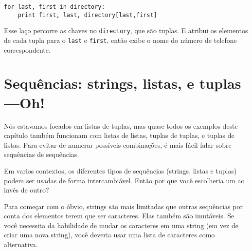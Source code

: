 
\beforeverb
\begin{verbatim}
for last, first in directory:
    print first, last, directory[last,first]
\end{verbatim}
\afterverb
%
Esse laço percorre as chaves no {\tt directory}, que são tuplas. E atribui
os elementos de cada tupla para o {\tt last} e {\tt first}, então exibe o
nome do número de telefone correspondente.

\section{Sequências: strings, listas, e tuplas---Oh!}

Nós estavamos focados em listas de tuplas, mas quase todos os exemplos deste
capítulo também funcionam com listas de listas, tuplas de tuplas, e tuplas de
listas. Para evitar de numerar possíveis combinações, é mais fácil falar
sobre sequências de sequências.

Em varios contextos, os diferentes tipos de sequências (strings, listas e
tuplas) podem ser usadas de forma intercambiável. Então por que você
escolheria um ao invés de outro?


Para começar com o óbvio, strings são mais limitadas que outras sequências
por conta dos elementos terem que ser caracteres. Elas também são imutáveis.
Se você necessita da habilidade de mudar os caracteres em uma string (em vez
de criar uma nova string), você deveria usar uma lista de caracteres como
alternativa.


